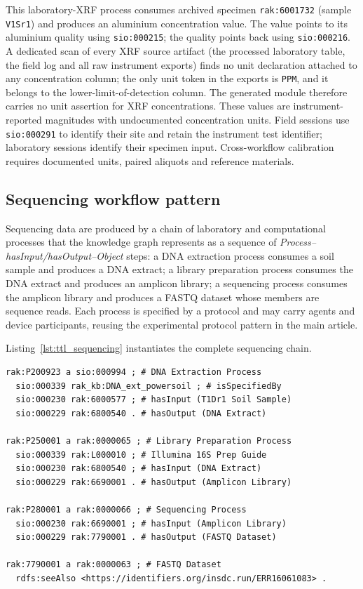 This laboratory-XRF process consumes archived specimen
\texttt{rak:6001732} (sample \texttt{V1Sr1}) and produces an aluminium
concentration value.
The value points to its aluminium quality using
\texttt{sio:000215}; the quality points back using
\texttt{sio:000216}. A dedicated scan of every
XRF source artifact (the processed laboratory table, the field log
and all raw instrument exports)
finds no unit
declaration attached to any concentration column; the only unit token
in the exports is \texttt{PPM}, and it belongs to the
lower-limit-of-detection column. The generated module therefore carries
no unit assertion for XRF concentrations. These values are
instrument-reported magnitudes with undocumented concentration units.
Field sessions use \texttt{sio:000291} to identify their site and
retain the instrument test identifier; laboratory sessions identify
their specimen input. Cross-workflow calibration requires documented
units, paired aliquots and reference materials.

\subsection{Sequencing workflow pattern}

Sequencing data are produced by a chain of laboratory and
computational processes that the knowledge graph represents as a
sequence of \emph{Process--hasInput/hasOutput--Object} steps: a DNA
extraction process consumes a soil sample and produces a DNA extract;
a library preparation process consumes the DNA extract and produces
an amplicon library; a sequencing process consumes the amplicon
library and produces a FASTQ dataset whose members are sequence reads.
Each process is specified by a protocol and may carry agents and
device participants, reusing the experimental protocol pattern in the main article.



Listing~\ref{lst:ttl_sequencing} instantiates the complete sequencing chain.

\begin{lstlisting}[caption={Turtle representation of the sequencing workflow from soil sample T1Dr1 to ENA run ERR16061083.}, label={lst:ttl_sequencing}, basicstyle=\ttfamily\scriptsize, frame=single]
rak:P200923 a sio:000994 ; # DNA Extraction Process
  sio:000339 rak_kb:DNA_ext_powersoil ; # isSpecifiedBy
  sio:000230 rak:6000577 ; # hasInput (T1Dr1 Soil Sample)
  sio:000229 rak:6800540 . # hasOutput (DNA Extract)

rak:P250001 a rak:0000065 ; # Library Preparation Process
  sio:000339 rak:L000010 ; # Illumina 16S Prep Guide
  sio:000230 rak:6800540 ; # hasInput (DNA Extract)
  sio:000229 rak:6690001 . # hasOutput (Amplicon Library)

rak:P280001 a rak:0000066 ; # Sequencing Process
  sio:000230 rak:6690001 ; # hasInput (Amplicon Library)
  sio:000229 rak:7790001 . # hasOutput (FASTQ Dataset)

rak:7790001 a rak:0000063 ; # FASTQ Dataset
  rdfs:seeAlso <https://identifiers.org/insdc.run/ERR16061083> .
\end{lstlisting}

